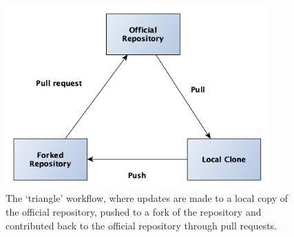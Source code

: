 \documentclass[11pt,a4paper]{ivoa}
\begin{document}
\begin{figure}[th]
  \begin{center}
    \includegraphics[width=0.9\textwidth]{triangle_workflow.png}
  \end{center}
  \caption{The `triangle' workflow, where updates are made to a local
      copy of the official repository, pushed to a fork of the
      repository and contributed back to the official repository
      through pull requests.}
  \label{fig:triangleWorkflow}
\end{figure}
\end{document}
